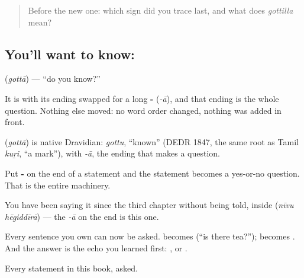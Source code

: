 \begin{quote}
Before the new one: which sign did you trace last, and what does \emph{gottilla} mean?
\end{quote}

\subsection*{You'll want to know: }
\textbf{} (\emph{gottā}) — \textquotedblleft{}do you know?\textquotedblright{}

It is  with its ending swapped for a long \textbf{-} (\emph{-ā}), and that ending is the whole question. Nothing else moved: no word order changed, nothing was added in front.

\begin{cousinweb}
\textbf{} (\emph{gottā}) is native Dravidian: \emph{gottu}, \textquotedblleft{}known\textquotedblright{} (DEDR 1847, the same root as Tamil \emph{kuṟi}, \textquotedblleft{}a mark\textquotedblright{}), with \emph{-ā}, the ending that makes a question.
\end{cousinweb}

\begin{grammarlens}[title={Grammar Lens: one ending turns any statement into a question}]
Put \textbf{-} on the end of a statement and the statement becomes a yes-or-no question. That is the entire machinery.

You have been saying it since the third chapter without being told, inside \textbf{ } (\emph{nīvu hēgiddīrā}) — the \emph{-ā} on the end is this one.

Every sentence you own can now be asked.   becomes   (\textquotedblleft{}is there tea?\textquotedblright{});   becomes  . And the answer is the echo you learned first: , or .
\end{grammarlens}

\begin{grammarlens}[title={What you've built}]
Every statement in this book, asked.
\end{grammarlens}

